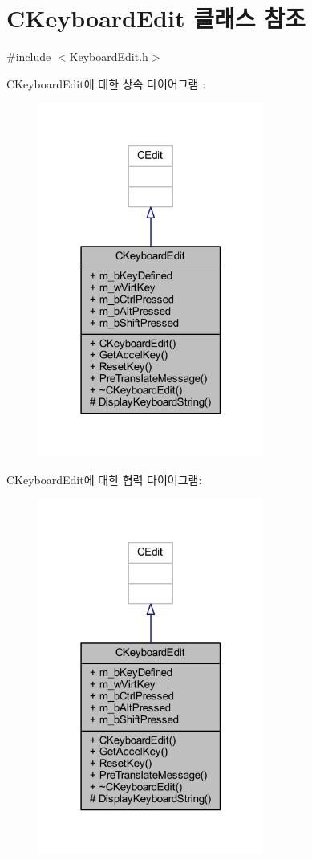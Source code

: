 \hypertarget{class_c_keyboard_edit}{}\section{C\+Keyboard\+Edit 클래스 참조}
\label{class_c_keyboard_edit}


{\ttfamily \#include $<$Keyboard\+Edit.\+h$>$}



C\+Keyboard\+Edit에 대한 상속 다이어그램 \+: \nopagebreak
\begin{figure}[H]
\begin{center}
\leavevmode
\includegraphics[width=210pt]{class_c_keyboard_edit__inherit__graph}
\end{center}
\end{figure}


C\+Keyboard\+Edit에 대한 협력 다이어그램\+:\nopagebreak
\begin{figure}[H]
\begin{center}
\leavevmode
\includegraphics[width=210pt]{class_c_keyboard_edit__coll__graph}
\end{center}
\end{figure}
